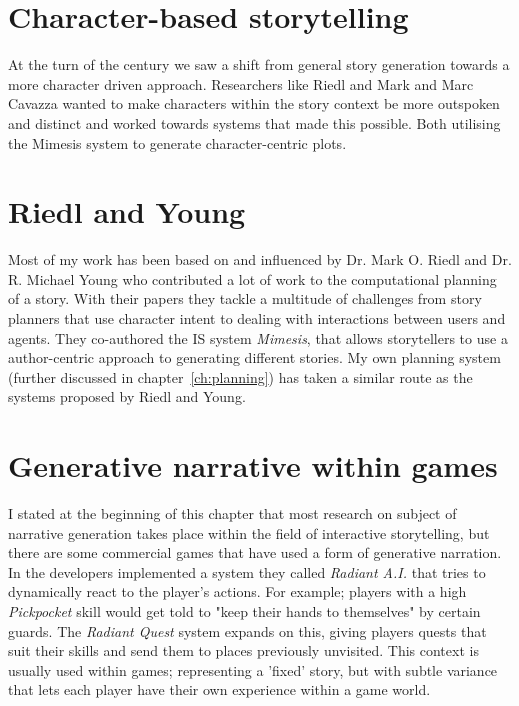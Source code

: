 \section{Character-based storytelling}
At the turn of the century we saw a shift from general story generation towards a more character driven approach. Researchers like Riedl and Mark\cite{Riedl03character-focusednarrative}\cite{riedl2010narrative} and Marc Cavazza\cite{Cavazza:2002:CIS:630325.630747} wanted to make characters within the story context be more outspoken and distinct and worked towards systems that made this possible. Both utilising the Mimesis system to generate character-centric plots. 

\section{Riedl and Young} 
Most of my work has been based on and influenced by Dr. Mark O. Riedl and Dr. R. Michael Young who contributed a lot of work to the computational planning of a story. With their papers\cite{Riedl03character-focusednarrative}\cite{Riedl:2003:MIU:860575.860694}\citep{Riedl:2004:IPM:1018409.1018753} they tackle a multitude of challenges from story planners that use character intent to dealing with interactions between users and agents. They co-authored the IS system \textit{Mimesis}\citep{young2003towards}, that allows storytellers to use a author-centric approach to generating different stories. My own planning system (further discussed in chapter~\ref{ch:planning}) has taken a similar route as the systems proposed by Riedl and Young.

\section{Generative narrative within games}
I stated at the beginning of this chapter that most research on subject of narrative generation takes place within the field of interactive storytelling, but there are some commercial games that have used a form of generative narration. In  the developers implemented a system they called \textit{Radiant A.I.} that tries to dynamically react to the player's actions. For example; players with a high \textit{Pickpocket} skill would get told to "keep their hands to themselves" by certain guards. The \textit{Radiant Quest} system expands on this, giving players quests that suit their skills and send them to places previously unvisited. This context is usually used within games; representing a 'fixed' story, but with subtle variance that lets each player have their own experience within a game world. 

